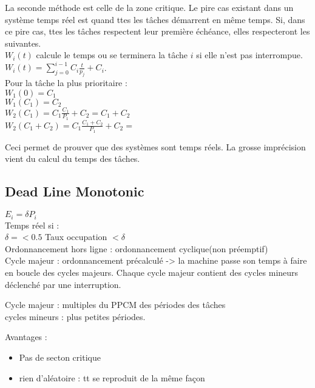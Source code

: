 \documentclass{article}
\begin{document}
\begin{itemeize}
\vskip 1cm
La seconde méthode est celle de la zone critique. Le pire cas existant dans un système temps réel est quand ttes les tâches démarrent en même temps. Si, dans ce pire cas, ttes les tâches respectent leur première échéance, elles respecteront les suivantes.\\
$W_i(t)$ calcule le temps ou se terminera la tâche $i$ si elle n'est pas interrompue. $W_i(t) = \sum_{j =0}^{i-1} C_i \frac{t}{p_j} + C_i$.\\
Pour la tâche la plus prioritaire :\\$W_1(0) = C_1$\\
$W_1(C_1) = C_2$\\
$W_2(C_1) = C_1\frac{C_1}{P_1} + C_2 =  C_1 + C_2$\\
$W_2(C_1 + C_2) = C_1\frac{C_1 + C_2}{P_1} + C_2 = $

Ceci permet de prouver que des systèmes sont temps réels. La grosse imprécision vient du calcul du temps des tâches.


\vskip 1cm
\subsection{Dead Line Monotonic}
$E_i = \delta P_i$\\
Temps réel si :\\
$\delta =< 0.5 $ Taux occupation $< \delta$\\


Ordonnancement hors ligne : ordonnancement cyclique(non préemptif)\\
Cycle majeur : ordonnancement précalculé -> la machine passe son temps à faire en boucle des cycles majeurs. Chaque cycle majeur contient des cycles mineurs déclenché par une interruption.

Cycle majeur : multiples du PPCM des périodes des tâches\\
cycles mineurs : plus petites périodes.

Avantages :
\begin{itemize}
	\item Pas de secton critique
	\item rien d'aléatoire : tt se reproduit de la même façon
\end{itemize}

\vskip 1cm

\end{itemeize}
\end{document}
